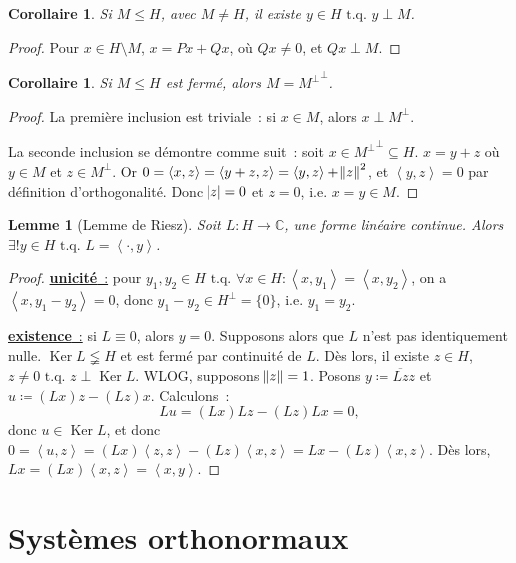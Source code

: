 \documentclass{report}
\DeclareMathOperator{\Ker}{Ker}
\newcommand{\C}{{\mathbb C}}
\newcommand{\scpr}[2]{\left\langle#1, #2\right\rangle}
\newcommand{\tq}{\text{ t.q. }}
\newcommand{\unic}{{\underline {\textbf{unicité}~:}} }
\newcommand{\exis}{{\underline {\textbf{existence}~:}} }
\newtheorem{cor}[thm]{Corollaire}
\newtheorem{lem}[thm]{Lemme}
\theoremstyle{definition}
\theoremstyle{remark}
\newtheorem*{rmq}{Remarque}
\begin{document}
\begin{cor} Si $M \leq H$, avec $M \neq H$, il existe $y \in H \tq y \perp M$.
\end{cor}

\begin{proof} Pour $x \in H \setminus M$, $x = Px+Qx$, où $Qx \neq 0$, et $Qx \perp M$.
\end{proof}


\begin{cor} Si $M \leq H$ est fermé, alors $M = {M^\perp}^\perp$.
\end{cor}

\begin{proof} La première inclusion est triviale~: si $x \in M$, alors $x \perp M^\perp$.

La seconde inclusion se démontre comme suit~: soit $x \in {M^\perp}^\perp \subseteq H$. $x = y+z$ où $y \in M$ et $z \in M^\perp$.
Or $0 = \scpr xz = \scpr {y+z}z = \scpr yz + \norm z^2$, et $\scpr yz = 0$ par définition d'orthogonalité. Donc $\abs z = 0$ et $z=0$, i.e. $x=y \in M$.
\end{proof}

\begin{lem}[Lemme de Riesz] Soit $L : H \to \C$, une forme linéaire continue. Alors $\exists! y \in H \tq L = \scpr \cdot y$.
\end{lem}

\begin{proof} \unic pour $y_1, y_2 \in H \tq \forall x \in H : \scpr x{y_1} = \scpr x{y_2}$, on a $\scpr x{y_1-y_2} = 0$, donc $y_1-y_2 \in H^\perp = \{0\}$, i.e. $y_1=y_2$.

\exis si $L \equiv 0$, alors $y=0$. Supposons alors que $L$ n'est pas identiquement nulle. $\Ker L \lneqq H$ et est fermé par continuité de $L$. Dès lors, il existe $z \in H$,
$z \neq 0 \tq z \perp \Ker L$. WLOG, supposons $\norm z = 1$. Posons $y \coloneqq \overline {Lz}z$ et $u \coloneqq (Lx)z - (Lz)x$. Calculons~:
\[Lu = (Lx)Lz - (Lz)Lx = 0,\]
donc $u \in \Ker L$, et donc $0 = \scpr uz = (Lx)\scpr zz - (Lz)\scpr xz = Lx-(Lz)\scpr xz$. Dès lors, $Lx = (Lx)\scpr xz = \scpr xy$.
\end{proof}

\section{Systèmes orthonormaux}
\end{document}
